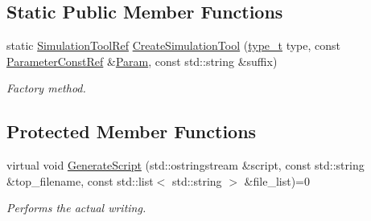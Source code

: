 \subsection*{Static Public Member Functions}
\begin{DoxyCompactItemize}
\item 
static \hyperlink{SimulationTool_8hpp_ac6ee25f5bd64bf5c2795c731e142d3c6}{Simulation\+Tool\+Ref} \hyperlink{classSimulationTool_ac6008e072848fe260c350492afc86076}{Create\+Simulation\+Tool} (\hyperlink{classSimulationTool_a6f5b094bef3306e5611c0a3a9ade0a0c}{type\+\_\+t} type, const \hyperlink{Parameter_8hpp_a37841774a6fcb479b597fdf8955eb4ea}{Parameter\+Const\+Ref} \&\hyperlink{classSimulationTool_adc409fd8f18901e2d0ea4a6ab6690138}{Param}, const std\+::string \&suffix)
\begin{DoxyCompactList}\small\item\em Factory method. \end{DoxyCompactList}\end{DoxyCompactItemize}
\subsection*{Protected Member Functions}
\begin{DoxyCompactItemize}
\item 
virtual void \hyperlink{classSimulationTool_afd99529bb7adb46081071097ceae7643}{Generate\+Script} (std\+::ostringstream \&script, const std\+::string \&top\+\_\+filename, const std\+::list$<$ std\+::string $>$ \&file\+\_\+list)=0
\begin{DoxyCompactList}\small\item\em Performs the actual writing. \end{DoxyCompactList}\end{DoxyCompactItemize}
